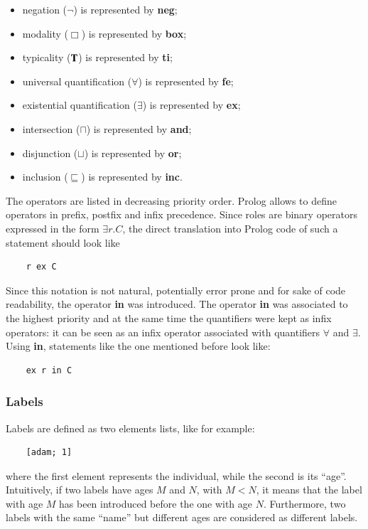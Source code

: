 \documentclass[a4paper, 11pt, oneside]{elsarticle}
\newcommand{\tip}{{\bf T}}
\newcommand{\perogni} {\forall}
\newcommand{\esiste} {\exists}
\begin{document}
\begin{itemize}
\item negation ($\neg$) is represented by \textbf{neg};
\item modality ($\Box$) is represented by \textbf{box};
\item typicality ($\tip$) is represented by \textbf{ti};
\item universal quantification ($\perogni$) is represented by \textbf{fe};
\item existential quantification ($\esiste$) is represented by \textbf{ex};
\item intersection ($\sqcap$) is represented by \textbf{and};
\item disjunction ($\sqcup$) is represented by \textbf{or};
\item inclusion ($\sqsubseteq$) is represented by \textbf{inc}.
\end{itemize}

The operators are listed in decreasing priority order.
Prolog allows to define operators in prefix, postfix and infix precedence.
Since roles are binary operators expressed in the form $\esiste r.C$, the direct translation into Prolog code of such a statement should look like
\begin{verbatim}
    r ex C
\end{verbatim}
Since this notation is not natural, potentially error prone and for sake of code readability, the operator \textbf{in} was introduced.
The operator \textbf{in} was associated to the highest priority and at the same time the quantifiers were kept as infix operators: it can be seen as an infix operator associated with quantifiers $\perogni$ and $\esiste$.
Using \textbf{in}, statements like the one mentioned before look like:
\begin{verbatim}
    ex r in C
\end{verbatim}

\subsubsection{Labels}
Labels are defined as two elements lists, like for example:
\begin{verbatim}
    [adam; 1]
\end{verbatim}
where the first element represents the individual, while the second is its ``age''.
Intuitively, if two labels have ages $M$ and $N$, with $M < N$, it means that the label with age $M$ has been introduced before the one with age $N$.
Furthermore, two labels with the same ``name'' but different ages are considered as different labels.\\
\end{document}
